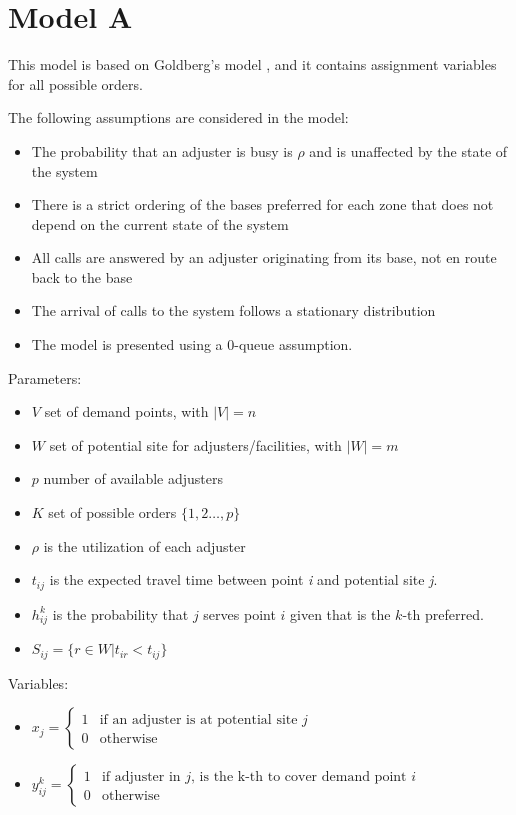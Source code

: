
\section{Model A}

This model is based on Goldberg's model \cite{goldberg1990validating},
and it contains assignment variables
for all possible orders.

The following assumptions are considered in the model:
\begin{itemize}
\item The probability that an adjuster is busy
  is $\rho$ and is unaffected by the state of the system
\item There is a strict ordering of the bases preferred for each zone
  that does not depend
  on the current state of the system
\item All calls are answered
  by an adjuster originating from its base,
  not en route back to the base
\item The arrival of calls to the system
  follows a stationary distribution
\item The model is presented
  using a 0-queue assumption.
\end{itemize}

Parameters:
\begin{itemize}
\item $V$ set of demand points, 
  with $|V| = n$
\item $W$ set of potential site for adjusters/facilities,
  with $|W| = m$
\item $p$ number of available adjusters
\item $K$ set of possible orders $\{1,2\ldots,p\}$
\item $\rho$ is the utilization of each adjuster
\item $t_{ij}$ is the expected travel time
  between point \textit{i}
  and potential site \textit{j}.
\item $h_{ij}^{k}$ is the probability
  that $j$ serves point $i$
  given that
  is the $k$-th preferred.
\item $S_{ij} = \{
  r \in W | t_{ir} < t_{ij}
  \}$
\end{itemize}

Variables:
\begin{itemize}
\item $x_j =
  \begin{cases} 
    1 & \mbox{if an adjuster is at potential site } j \\
    0 & \mbox{otherwise}
  \end{cases}$
\item $y_{ij}^k =
  \begin{cases} 
    1 & \mbox{if adjuster in } j \mbox{, is the k-th to cover demand point }i \\
    0 & \mbox{otherwise}
  \end{cases}$
\end{itemize}


